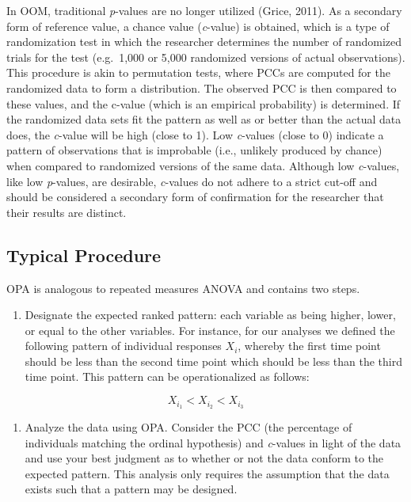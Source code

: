 \documentclass[,man, mask]{apa6}
\providecommand{\tightlist}{%
  \setlength{\itemsep}{0pt}\setlength{\parskip}{0pt}}
\theoremstyle{definition}
\theoremstyle{definition}
\theoremstyle{definition}
\theoremstyle{remark}
\begin{document}
In OOM, traditional \emph{p}-values are no longer utilized (Grice,
2011). As a secondary form of reference value, a chance value
(\emph{c}-value) is obtained, which is a type of randomization test in
which the researcher determines the number of randomized trials for the
test (e.g.~1,000 or 5,000 randomized versions of actual observations).
This procedure is akin to permutation tests, where PCCs are computed for
the randomized data to form a distribution. The observed PCC is then
compared to these values, and the c-value (which is an empirical
probability) is determined. If the randomized data sets fit the pattern
as well as or better than the actual data does, the \emph{c}-value will
be high (close to 1). Low \emph{c}-values (close to 0) indicate a
pattern of observations that is improbable (i.e., unlikely produced by
chance) when compared to randomized versions of the same data. Although
low \emph{c}-values, like low \emph{p}-values, are desirable,
\emph{c}-values do not adhere to a strict cut-off and should be
considered a secondary form of confirmation for the researcher that
their results are distinct.

\subsection{Typical Procedure}\label{typical-procedure-1}

OPA is analogous to repeated measures ANOVA and contains two steps.

\begin{enumerate}
\def\labelenumi{\arabic{enumi})}
\tightlist
\item
  Designate the expected ranked pattern: each variable as being higher,
  lower, or equal to the other variables. For instance, for our analyses
  we defined the following pattern of individual responses \(X_i\),
  whereby the first time point should be less than the second time point
  which should be less than the third time point. This pattern can be
  operationalized as follows:
\end{enumerate}

\[
  X_{i_1} < X_{i_2} < X_{i_3}   
\]

\begin{enumerate}
\def\labelenumi{\arabic{enumi})}
\setcounter{enumi}{1}
\tightlist
\item
  Analyze the data using OPA. Consider the PCC (the percentage of
  individuals matching the ordinal hypothesis) and \emph{c}-values in
  light of the data and use your best judgment as to whether or not the
  data conform to the expected pattern. This analysis only requires the
  assumption that the data exists such that a pattern may be designed.
\end{enumerate}
\end{document}
